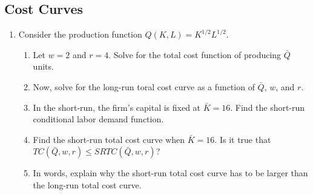 \documentclass[11pt]{article}
\newcommand{\answer}[1]{\iftoggle{INCLUDEANSWERS}{{\color{violet!70!white}\textbf{Solution:} #1}}{}}
\begin{document}
\subsection*{Cost Curves}
\begin{enumerate}
  \item Consider the production function $Q(K, L) = K^{1/2}L^{1/2}$.
  \begin{enumerate}
    \item Let $w = 2$ and $r = 4$. Solve for the total cost function of producing $\bar{Q}$ units.
    
    \item Now, solve for the long-run toral cost curve as a function of $\bar{Q}$, $w$, and $r$.
    
    \item In the short-run, the firm's capital is fixed at $\bar{K} = 16$. Find the short-run conditional labor demand function. 
    
    \item Find the short-run total cost curve when $\bar{K} = 16$. Is it true that $TC(\bar{Q}, w, r) \leq SRTC(\bar{Q}, w, r)$?
    
    \item In words, explain why the short-run total cost curve has to be larger than the long-run total cost curve.
  \end{enumerate} 

  \answer{
    \begin{enumerate}
      \item The optimality condition is $L = 2K$. Plugging this into the production constraint yields
      $$
        \bar{Q} = (2K)^{1/2} K^{1/2} = \sqrt{2} K  \implies K^* = \bar{Q}/\sqrt{2}
      $$
      Pluggin $K^*$ back into the optimality condition yields $L^* = \sqrt{2}\bar{Q}$.

      Thus, the total cost is given by 
      $$
      TC(\bar{Q}) = wL^* + rK^* = 2\sqrt{2} \bar{Q} + 4/\sqrt{2} \bar{Q}
      $$

      \item The optimality condition is $L = \frac{r}{w} K$. Plugging this into the production constraint yields
      $$
        \bar{Q} = (\frac{r}{w} K)^{1/2} K^{1/2} = \sqrt{\frac{r}{w}} K  \implies K^* = \sqrt{\frac{w}{r}} \bar{Q} 
      $$
      Pluggin $K^*$ back into the optimality condition yields $L^* = \sqrt{\frac{w}{r}} \bar{Q}$.

      Thus, the total cost is given by 
      $$
      TC(\bar{Q}) = wL^* + rK^* = w \sqrt{\frac{w}{r}} \bar{Q} + r \sqrt{\frac{w}{r}} \bar{Q}
      $$


\end{enumerate}}
\end{enumerate}
\end{document}
